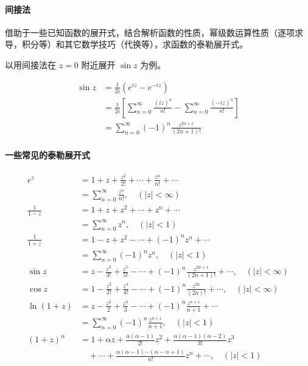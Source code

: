 \paragraph{间接法}
\label{间接法}
借助于一些已知函数的展开式，结合解析函数的性质，幂级数运算性质（逐项求导，积分等）和其它数学技巧（代换等），求函数的泰勒展开式。

以用间接法在 \(z=0\) 附近展开 \(\sin z\) 为例。

\begin{align*}
    \sin z &= \frac{1}{2i}(e^{iz}-e^{-iz})
    \\
    &= \frac{1}{2i}[\sum _{n=0}^{\infty}\frac{(iz)^n}{n!} - \sum _{n=0}^{\infty}\frac{(-iz)^n}{n!}]
    \\
    &= \sum _{n=0}^{\infty}(-1)^n\frac{z^{2n+1}}{(2n+1)!}
\end{align*}
\paragraph{一些常见的泰勒展开式}
\label{一些常见的泰勒展开式}
\begin{align*}
    e^{z} &= 1 + z + \frac{z^{2}}{2!} + \cdots + \frac{z^{n}}{n!} + \cdots
    \\
    &= \sum_{n=0}^{\infty} \frac{z^{n}}{n!}, \quad (|z| < \infty)
\\
    \frac{1}{1-z} &= 1 + z + z^{2} + \cdots + z^{n} + \cdots
    \\
    &= \sum_{n=0}^{\infty} z^{n}, \quad (|z| < 1)
\\
    \frac{1}{1+z} &= 1 - z + z^{2} - \cdots + (-1)^{n}z^{n} + \cdots
    \\
    &= \sum_{n=0}^{\infty} (-1)^{n}z^{n}, \quad (|z| < 1)
\\
    \sin z &= z - \frac{z^{3}}{3!} + \frac{z^{5}}{5!} - \cdots + (-1)^{n}\frac{z^{2n+1}}{(2n+1)!} + \cdots, \quad (|z| < \infty)
\\
    \cos z &= 1 - \frac{z^{2}}{2!} + \frac{z^{4}}{4!} - \cdots + (-1)^{n}\frac{z^{2n}}{(2n)!} + \cdots, \quad (|z| < \infty)
\\
    \ln(1+z) &= z - \frac{z^{2}}{2} + \frac{z^{3}}{3} - \cdots + (-1)^{n}\frac{z^{n+1}}{n+1} + \cdots \\
            &= \sum_{n=0}^{\infty} (-1)^{n} \frac{z^{n+1}}{n+1}, \quad (|z| < 1)
\\
    (1+z)^{\alpha} &= 1 + \alpha z + \frac{\alpha(\alpha-1)}{2!}z^{2} + \frac{\alpha(\alpha-1)(\alpha-2)}{3!}z^{3}
    \\
    &\quad + \cdots + \frac{\alpha(\alpha-1)\cdots(\alpha-n+1)}{n!}z^{n} + \cdots, \quad (|z| < 1)
\end{align*}
